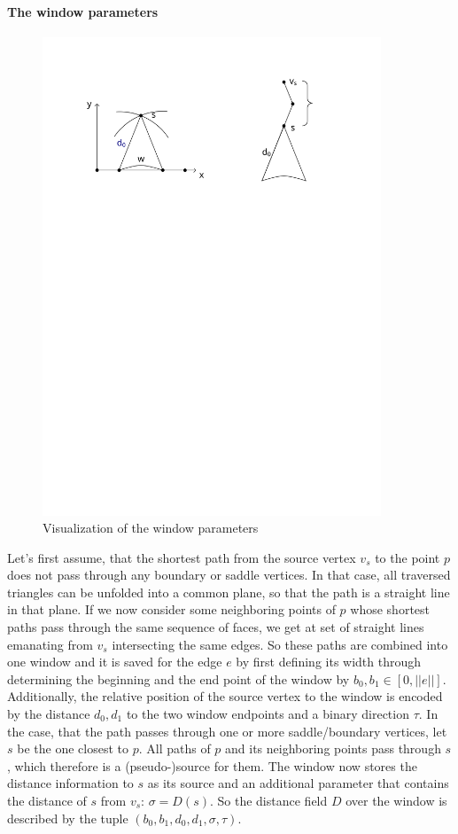 \paragraph{The window parameters}
\begin{figure}[h]
	\centering
	\includegraphics[width = 0.9\textwidth]{pictures/geodesics_parameters}
	\caption{Visualization of the window parameters}
	\label{fig:geo_param}
\end{figure}
Let's first assume, that the shortest path from the source vertex $v_s$ to the point $p$ does not pass through any boundary or saddle vertices.
In that case, all traversed triangles can be unfolded into a common plane, so that the path is a straight line in that plane.
If we now consider some neighboring points of $p$ whose shortest paths pass through the same sequence of faces, we get at set of straight lines emanating from $v_s$ intersecting the same edges.
So these paths are combined into one window and it is saved for the edge $e$ by first defining its width through determining the beginning and the end point of the window by $b_0, b_1 \in [0,||e||]$.
Additionally, the relative position of the source vertex to the window is encoded by the distance $d_0,d_1$ to the two window endpoints and a binary direction $\tau$.
In the case, that the path passes through one or more saddle/boundary vertices, let $s$ be the one closest to $p$.
All paths of $p$ and its neighboring points pass through $s$, which therefore is a (pseudo-)source for them.
The window now stores the distance information to $s$ as its source and an additional parameter that contains the distance of $s$ from $v_s$: $\sigma = D(s)$.
So the distance field $D$ over the window is described by the tuple $(b_0,b_1,d_0,d_1,\sigma,\tau)$.

